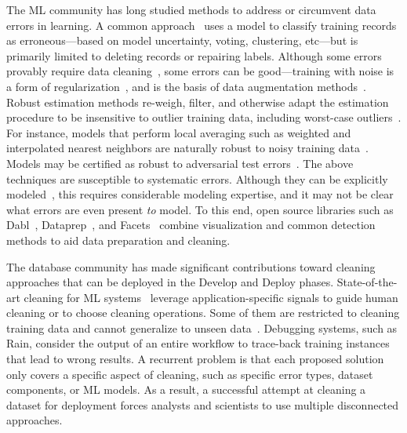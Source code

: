 \documentclass[11pt,dvipsnames]{article}
\begin{document}
The ML community has long studied methods to address or circumvent data errors in learning.  
A common approach~\cite{OutlierDetectionSurvey} uses a model to classify training records as erroneous---based on model uncertainty, voting, clustering, etc---but is primarily limited to deleting records or repairing labels.
Although some errors provably require data cleaning~\cite{liu_robust_2020}, some errors can be good---training with noise is a form of regularization~\cite{bishop1995training}, and is the basis of data augmentation methods~\cite{van2001art}.  Robust estimation methods re-weigh, filter, and otherwise adapt the estimation procedure to be insensitive to outlier training data, including worst-case outliers~\cite{wilcox2011introduction,steinhardt2018robust}.  For instance, models that perform local averaging such as weighted and interpolated nearest neighbors are naturally robust to noisy training data~\cite{Belkin2018OverfittingOP}.   Models may be certified as robust to adversarial test errors~\cite{Madry2018TowardsDL,lecuyer2019certified,Raghunathan2018CertifiedDA}. The above techniques are susceptible to systematic errors.  Although they can be explicitly modeled~\cite{LearningOverDirtyDataWithoutCleaning}, this requires considerable modeling expertise, and it may not be clear what errors are even present {\it to} model. 
To this end, open source libraries such as Dabl~\cite{dabl}, Dataprep~\cite{dataprep}, and Facets~\cite{facets} combine visualization and common detection methods to aid data preparation and cleaning.




The database community has made significant contributions toward cleaning approaches that can be deployed in the Develop and Deploy phases. State-of-the-art cleaning for ML systems~\cite{ActiveClean, BoostClean, CPClean, AlphaClean, CPClean} leverage application-specific signals to guide human cleaning or to choose cleaning operations.
Some of them are restricted to cleaning training data and cannot generalize to unseen data~\cite{ActiveClean, CPClean}. Debugging systems, such as Rain, consider the output of an entire workflow to trace-back training instances that lead to wrong results. 
A recurrent problem is that each proposed solution only covers a specific aspect of cleaning, such as specific error types, dataset components, or ML models. As a result, a successful attempt at cleaning a dataset for deployment forces analysts and scientists to use multiple disconnected approaches.
\end{document}
